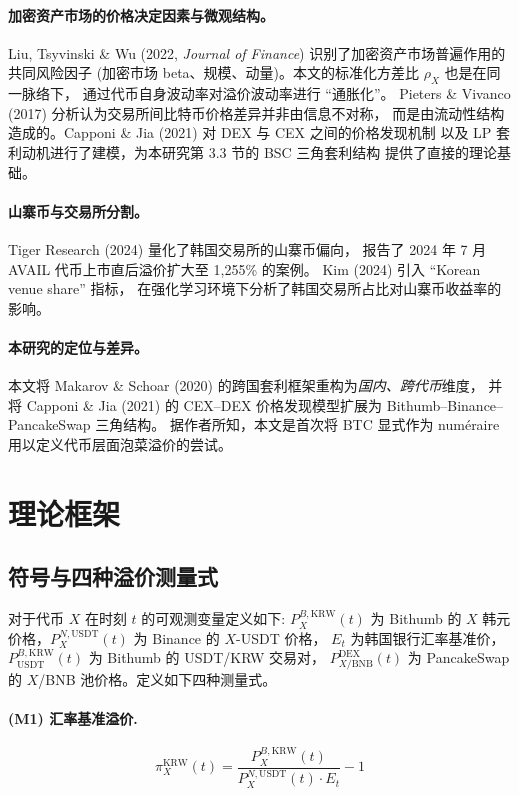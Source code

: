 \documentclass[11pt,a4paper]{article}
\begin{document}
\paragraph{加密资产市场的价格决定因素与微观结构。}
Liu, Tsyvinski \& Wu (2022, \emph{Journal of Finance}) 识别了加密资产市场普遍作用的共同风险因子
(加密市场 beta、规模、动量)。本文的标准化方差比 $\rho_X$ 也是在同一脉络下，
通过代币自身波动率对溢价波动率进行 ``通胀化''。
Pieters \& Vivanco (2017) 分析认为交易所间比特币价格差异并非由信息不对称，
而是由流动性结构造成的。Capponi \& Jia (2021) 对 DEX 与 CEX 之间的价格发现机制
以及 LP 套利动机进行了建模，为本研究第 3.3 节的 BSC 三角套利结构
提供了直接的理论基础。

\paragraph{山寨币与交易所分割。}
Tiger Research (2024) 量化了韩国交易所的山寨币偏向，
报告了 2024 年 7 月 AVAIL 代币上市直后溢价扩大至 1{,}255\% 的案例。
Kim (2024) 引入 ``Korean venue share'' 指标，
在强化学习环境下分析了韩国交易所占比对山寨币收益率的影响。

\paragraph{本研究的定位与差异。}
本文将 Makarov \& Schoar (2020) 的跨国套利框架重构为\emph{国内、跨代币}维度，
并将 Capponi \& Jia (2021) 的 CEX--DEX 价格发现模型扩展为 Bithumb--Binance--PancakeSwap 三角结构。
据作者所知，本文是首次将 BTC 显式作为 num\'eraire 用以定义代币层面泡菜溢价的尝试。

\section{理论框架}

\subsection{符号与四种溢价测量式}
对于代币 $X$ 在时刻 $t$ 的可观测变量定义如下:
$P_X^{B,\text{KRW}}(t)$ 为 Bithumb 的 $X$ 韩元价格，$P_X^{N,\text{USDT}}(t)$ 为 Binance 的 $X$-USDT 价格，
$E_t$ 为韩国银行汇率基准价，$P_{\text{USDT}}^{B,\text{KRW}}(t)$ 为 Bithumb 的 USDT/KRW 交易对，
$P_{X/\text{BNB}}^{\text{DEX}}(t)$ 为 PancakeSwap 的 $X$/BNB 池价格。定义如下四种测量式。

\paragraph{(M1) 汇率基准溢价.}
\begin{equation}
\pi^{\text{KRW}}_X(t) = \frac{P_X^{B,\text{KRW}}(t)}{P_X^{N,\text{USDT}}(t)\cdot E_t}-1
\label{eq:pi_krw}
\end{equation}
\end{document}
